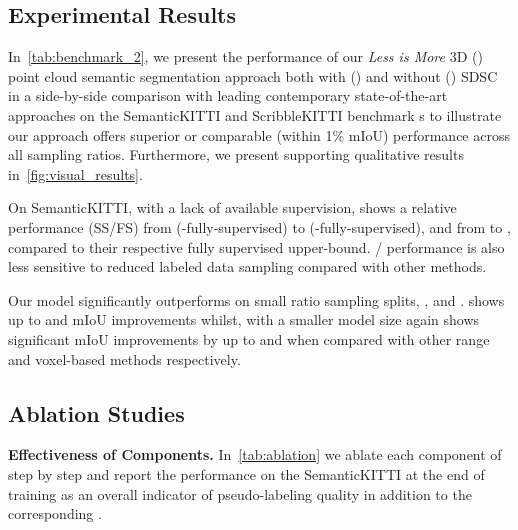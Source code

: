 \documentclass[10pt,twocolumn,letterpaper]{article}
\newcommand\bdtitle[1]{\noindent\textbf{#1}}
\begin{document}
\subsection{Experimental Results}
\vspace{-0.2cm}
\noindent
In~\cref{tab:benchmark_2}, we present the performance of our \textit{Less is More} 3D ({\ourmodel}) point cloud semantic segmentation approach both with ({\ourmodelsdsc}) and without ({\ourmodel}) SDSC in a side-by-side comparison with leading contemporary state-of-the-art approaches on the SemanticKITTI and ScribbleKITTI benchmark {\validset}s to illustrate our approach offers superior or comparable (within 1\% mIoU) performance across all sampling ratios. Furthermore, we present supporting qualitative results in~\cref{fig:visual_results}.

On SemanticKITTI, with a lack of available supervision, {\ourmodel} shows a relative performance (SS/FS) from  (-fully-supervised) to  (-fully-supervised), and {\ourmodelsdsc} from  to , compared to their respective fully supervised upper-bound. {\ourmodel}/{\ourmodelsdsc} performance is also less sensitive to reduced labeled data sampling compared with other methods.

Our model significantly outperforms on small ratio sampling splits, \eg,  and . {\ourmodel} shows up to  and  mIoU improvements whilst, with a smaller model size {\ourmodelsdsc} again shows significant mIoU improvements by up to  and  when compared with other range and voxel-based methods respectively.




\vspace{-0.15cm}
\subsection{Ablation Studies}
\vspace{-0.15cm}
\bdtitle{Effectiveness of Components.} In~\cref{tab:ablation} we ablate each component of {\ourmodel} step by step and report the performance on the SemanticKITTI {\trainset} at the end of training as an overall indicator of pseudo-labeling quality in addition to the corresponding {\validset}.
\end{document}
